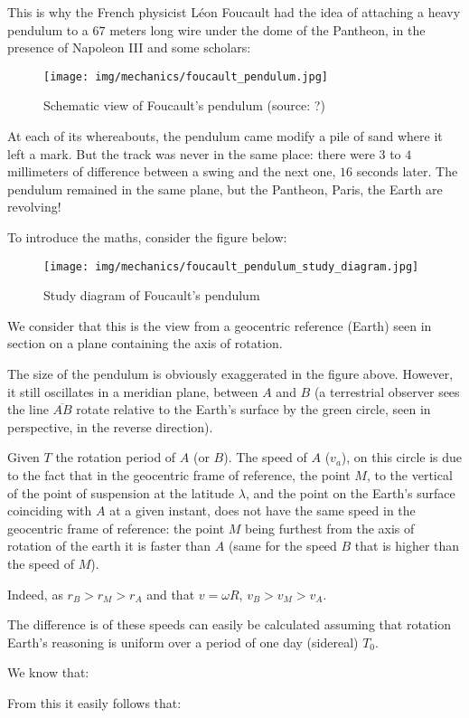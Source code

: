	This is why the French physicist Léon Foucault had the idea of attaching a heavy pendulum to a $67$ meters long wire under the dome of the Pantheon, in the presence of Napoleon III and some scholars:
	\begin{figure}[H]
		\centering
		\texttt{[image: img/mechanics/foucault\_pendulum.jpg]}
		\caption{Schematic view of Foucault's pendulum (source: ?)}
	\end{figure}
	At each of its whereabouts, the pendulum came modify a pile of sand where it left a mark. But the track was never in the same place: there were $3$ to $4$ millimeters of difference between a swing and the next one, $16$ seconds later. The pendulum remained in the same plane, but the Pantheon, Paris, the Earth are revolving!
	
	To introduce the maths, consider the figure below:
	\begin{figure}[H]
		\centering
		\texttt{[image: img/mechanics/foucault\_pendulum\_study\_diagram.jpg]}
		\caption[]{Study diagram of Foucault's pendulum}
	\end{figure}
	We consider that this is the view from a geocentric reference (Earth) seen in section on a plane containing the axis of rotation.

	The size of the pendulum is obviously exaggerated in the figure above. However, it still oscillates in a meridian plane, between $A$ and $B$ (a terrestrial observer sees the line $\overline{AB}$ rotate relative to the Earth's surface by the green circle, seen in perspective, in the reverse direction).
	
	Given $T$ the rotation period of $A$ (or $B$).  The speed of $A$ ($v_a$), on this circle is due to the fact that in the geocentric frame of reference, the point $M$, to the vertical of the point of suspension at the latitude $\lambda$, and the point on the Earth's surface coinciding with $A$ at a given instant, does not have the same speed in the geocentric frame of reference: the point $M$ being furthest from the axis of rotation of the earth it is faster than $A$ (same for the speed $B$ that is higher than the speed of $M$).

	Indeed, as $r_B>r_M>r_A$ and that $v=\omega R$, $v_B>v_M>v_A$.
	
	The difference is of these speeds can easily be calculated assuming that rotation Earth's reasoning is uniform over a period of one day (sidereal) $T_0$.

	We know that:
	
	From this it easily follows that:
	
